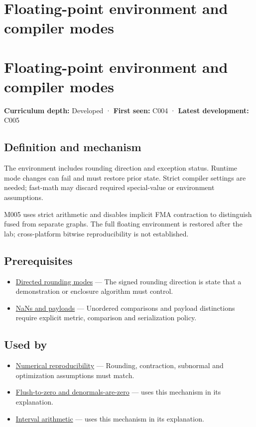 \hypertarget{appendix-f11d1a521253}{}
\section*{Floating-point environment and compiler modes}
\section{Floating-point environment and compiler modes}\label{floating-point-environment-and-compiler-modes}

\textbf{Curriculum depth:} Developed · \textbf{First seen:} C004 · \textbf{Latest development:} C005

\subsection{Definition and mechanism}\label{definition-and-mechanism}

The environment includes rounding direction and exception status. Runtime mode changes can fail and must restore prior state. Strict compiler settings are needed; fast-math may discard required special-value or environment assumptions.

M005 uses strict arithmetic and disables implicit FMA contraction to distinguish fused from separate graphs. The full floating environment is restored after the lab; cross-platform bitwise reproducibility is not established.

\subsection{Prerequisites}\label{prerequisites}

\begin{itemize}
\tightlist
\item
  \hyperref[appendix-637d164ae5ca]{Directed rounding modes} --- The signed rounding direction is state that a demonstration or enclosure algorithm must control.
\item
  \hyperref[appendix-d6607cc4c235]{NaNs and payloads} --- Unordered comparisons and payload distinctions require explicit metric, comparison and serialization policy.
\end{itemize}

\subsection{Used by}\label{used-by}

\begin{itemize}
\item
  \hyperref[appendix-5f1a2c3f97ff]{Numerical reproducibility} --- Rounding, contraction, subnormal and optimization assumptions must match.
\item
  \hyperref[appendix-e979eb012782]{Flush-to-zero and denormals-are-zero} --- uses this mechanism in its explanation.
\item
  \hyperref[appendix-1823a14330cb]{Interval arithmetic} --- uses this mechanism in its explanation.
\end{itemize}


